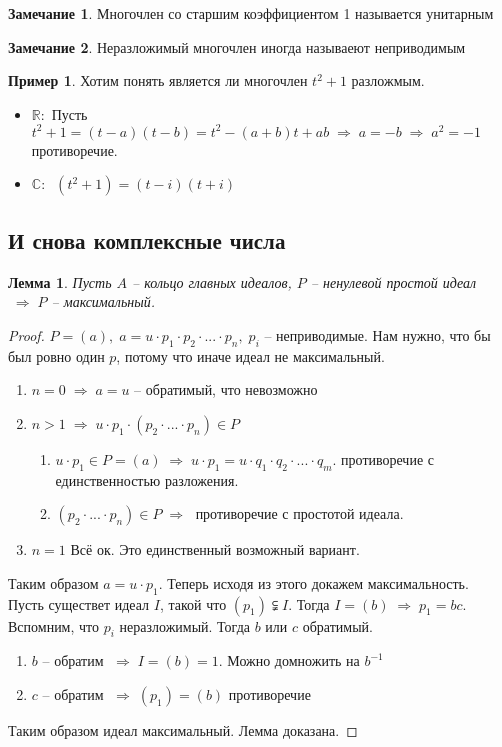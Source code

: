 \documentclass[12pt, a4paper]{article}
\newcommand{\re}{\mathds{R}}
\newcommand{\ra}{\;\Rightarrow\;}
\newcommand{\ce}{\mathds{C}}
\theoremstyle{plain}
\newtheorem*{Lemma*}{Лемма}
\theoremstyle{definition}
\newtheorem*{Remark*}{Замечание}
\newtheorem*{Example*}{Пример}
\begin{document}
\begin{Remark*}
    Многочлен со старшим коэффициентом  1 называется унитарным
\end{Remark*}
\begin{Remark*}
    Неразложимый многочлен иногда называеют неприводимым
\end{Remark*}
\begin{Example*}
    Хотим понять является ли многочлен $t^2+1$ разложмым.
    \begin{itemize}
        \item $\re:$ Пусть $t^2+1 = (t-a)(t-b) = t^2 - (a+b)t + ab \ra a=-b \ra a^2 = -1$ противоречие.
        \item $\ce:\;\; (t^2+1) = (t-i)(t+i)$ 
    \end{itemize}
\end{Example*}
\subsection*{И снова комплексные числа}
\begin{Lemma*}
    Пусть $A$ -- кольцо главных идеалов, $P$ -- ненулевой простой идеал $\ra P$ -- максимальный.
\end{Lemma*}

\begin{proof}
    $P = (a),\; a = u\cdot p_1\cdot p_2\cdot...\cdot p_n,\; p_i$ -- неприводимые. Нам нужно, что бы был ровно один $p$, потому что иначе идеал не максимальный.
    \begin{enumerate}
        \item $n = 0 \ra a = u$ -- обратимый, что невозможно
        \item $n > 1 \ra u\cdot p_1\cdot (p_2\cdot...\cdot p_n)\in P$
                \begin{enumerate}
                    \item $u\cdot p_1\in P = (a)\ra u\cdot p_1 = u\cdot q_1\cdot q_2\cdot...\cdot q_m$. противоречие с единственностью разложения.
                    \item $(p_2\cdot...\cdot p_n) \in P \ra$ противоречие с простотой идеала.
                \end{enumerate}
        \item $n = 1$ Всё ок. Это единственный возможный вариант.
    \end{enumerate}

    \noindent Таким образом $a = u\cdot p_1$. Теперь исходя из этого докажем максимальность.\\
    Пусть существет идеал $I$, такой что $(p_1)\subsetneqq I$. Тогда $I = (b)\ra p_1 = bc$. 
    Вспомним, что $p_i$ неразложимый. Тогда $b$ или $c$ обратимый.
    \begin{enumerate}
        \item $b$ -- обратим $\ra I = (b) = 1$. Можно домножить на $b^{-1}$
        \item $c$ -- обратим $\ra (p_1) = (b)$ противоречие 
    \end{enumerate}
    Таким образом идеал максимальный. Лемма доказана.
\end{proof}
\end{document}
